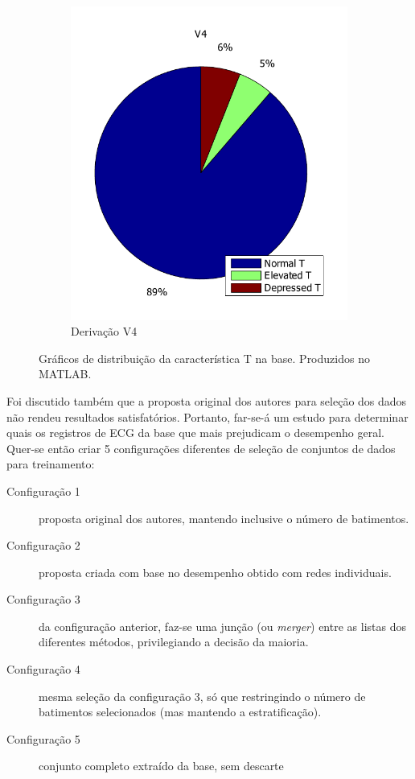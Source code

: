 \begin{figure}[ht]
\begin{subfigure}[b]{.4\textwidth}
        \includegraphics[width=\textwidth]{figures/chap6-v4-t-class-dist.pdf}
        \caption{Derivação V4}
        \label{fig:v4tclass}
    \end{subfigure}
    \caption[Gráficos de distribuição da característica T na base]{Gráficos de distribuição da característica T na base. Produzidos no MATLAB.}
\end{figure}

Foi discutido também que a proposta original dos autores para seleção dos dados não rendeu resultados satisfatórios. Portanto, far-se-á um estudo para determinar quais os registros de ECG da base que mais prejudicam o desempenho geral. Quer-se então criar 5 configurações diferentes de seleção de conjuntos de dados para treinamento:

\begin{description}
    \item[Configuração 1] proposta original dos autores, mantendo inclusive o número de batimentos.
    \item[Configuração 2] proposta criada com base no desempenho obtido com redes individuais.
    \item[Configuração 3] da configuração anterior, faz-se uma junção (ou \emph{merger}) entre as listas dos diferentes métodos, privilegiando a decisão da maioria.
    \item[Configuração 4] mesma seleção da configuração 3, só que restringindo o número de batimentos selecionados (mas mantendo a estratificação).
    \item[Configuração 5] conjunto completo extraído da base, sem descarte
\end{description}


